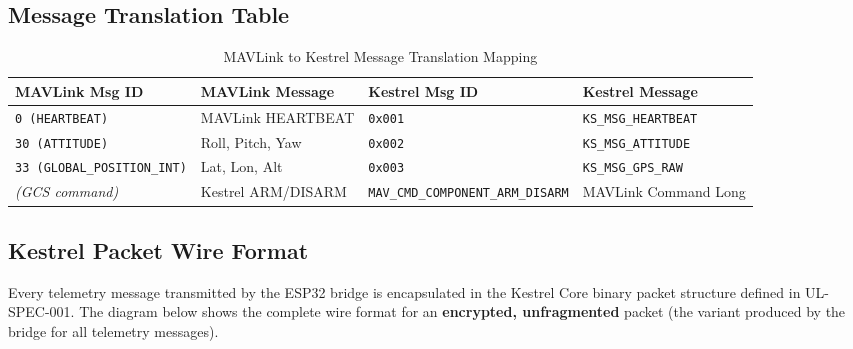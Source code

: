 \documentclass[11pt,a4paper]{article}
\begin{document}
\subsection{Message Translation Table}

\begin{table}[H]
    \centering
    \begin{tabularx}{\textwidth}{@{}lXlX@{}}
        \toprule
        \textbf{MAVLink Msg ID} & \textbf{MAVLink Message}    &
        \textbf{Kestrel Msg ID} & \textbf{Kestrel Message} \\
        \midrule
        \texttt{0 (HEARTBEAT)}            & MAVLink HEARTBEAT  &
        \texttt{0x001}                    & \texttt{KS\_MSG\_HEARTBEAT} \\
        \texttt{30 (ATTITUDE)}            & Roll, Pitch, Yaw   &
        \texttt{0x002}                    & \texttt{KS\_MSG\_ATTITUDE} \\
        \texttt{33 (GLOBAL\_POSITION\_INT)} & Lat, Lon, Alt    &
        \texttt{0x003}                    & \texttt{KS\_MSG\_GPS\_RAW} \\
        \textit{(GCS command)}            & Kestrel ARM/DISARM &
        \texttt{MAV\_CMD\_COMPONENT\_ARM\_DISARM} & MAVLink Command Long \\
        \bottomrule
    \end{tabularx}
    \caption{MAVLink to Kestrel Message Translation Mapping}
\end{table}


\subsection{Kestrel Packet Wire Format}
\label{sec:pktformat}

Every telemetry message transmitted by the ESP32 bridge is encapsulated in the
Kestrel Core binary packet structure defined in UL-SPEC-001.  The diagram below
shows the complete wire format for an \textbf{encrypted, unfragmented} packet
(the variant produced by the bridge for all telemetry messages).
\end{document}

